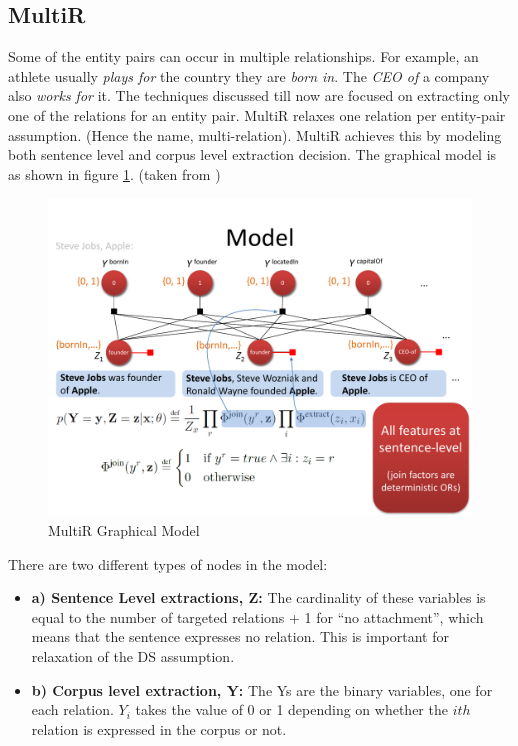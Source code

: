 \documentclass[a4paper,10pt]{article}
\begin{document}
\subsection{MultiR \cite{multir}}
Some of the entity pairs can occur in multiple relationships. For example, an athlete usually \emph{plays for} the 
country they are \emph{born in}. The \emph{CEO of} a company also \emph{works for} it. The techniques discussed till now are 
focused on extracting only one of the relations for an entity pair. MultiR relaxes one relation per entity-pair assumption. 
(Hence the name, multi-relation). MultiR achieves this by modeling both sentence level and corpus level extraction decision.
The graphical model is as shown in figure \ref{fig:multir}. (taken from \cite{multir})
\begin{figure}[H]
 \centering
 \includegraphics[bb=0 0 720 540,scale=0.45]{./multirmode1.pdf}
 \caption{MultiR Graphical Model}
 \label{fig:multir}
\end{figure}

There are two different types of nodes in the model:
\begin{itemize}

\item \textbf {a) Sentence Level extractions, Z:}
The cardinality of these variables is equal to the number of targeted relations + 1 for ``no attachment'', which means that 
the sentence expresses no relation. This is important for relaxation of the DS assumption.

\item \textbf{b) Corpus level extraction, Y:}
The Ys are the binary variables, one for each relation. $Y_i$ takes the value of 0 or 1 depending on whether the $ith$ relation is expressed 
in the corpus or not.
\end{itemize}
\end{document}
